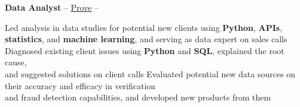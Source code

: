 \documentclass[letterpaper,MMMyyyy,nonstopmode]{simpleresumecv}
\begin{document}
\begin{Body}
\begin{Detail}
\begin{Detail}
\vspace{3.0mm}

\Entry
\begin{Detail}

\textbf{Data Analyst} -- \href{https://www.prove.com/}{Prove} \hfill {} \hspace{1mm} -- \hspace{1mm} %




\Gap

\BulletItem
Led analysis in data studies for potential new clients using \textbf{Python}, \textbf{APIs}, \\ \textbf{statistics}, and \textbf{machine learning}, and serving as data expert on sales calls
\BulletItem
Diagnosed existing client issues using \textbf{Python} and \textbf{SQL}, explained the root cause,\\ and suggested solutions on client calls
\BulletItem
Evaluated potential new data sources on their accuracy and efficacy in verification\\ and fraud detection capabilities, and developed new products from them

\vspace{3.0mm}








\end{Detail}
\end{Detail}
\end{Detail}
\end{Body}
\end{document}
